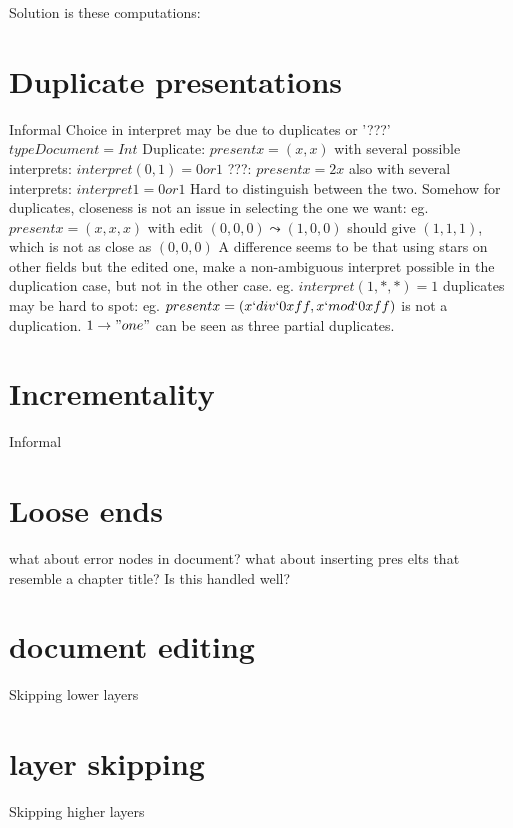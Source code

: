 Solution is these computations: 


%																
%																
%																
\section{Duplicate presentations}

Informal
\bl
\* Choice in interpret may be due to duplicates or '???'
\* $type Document = Int$ 
\* Duplicate: $present x = (x,x)$ with several possible interprets: $interpret (0,1) = 0 or 1$ 
\* ???: $present x = 2x$ also with several interprets: $interpret 1 = 0 or 1$ 
\* Hard to distinguish between the two.
\* Somehow for duplicates, closeness is not an issue in selecting the one we want:
\* eg. $present x = (x,x,x)$ with edit $(0,0,0)\leadsto(1,0,0)$ should give $(1,1,1)$, which is not as close as $(0,0,0)$
\* A difference seems to be that using stars on other fields but the edited one, make a non-ambiguous interpret possible in the duplication case, but not in the other case.
\* eg. $interpret (1,*,*) = 1$
\* duplicates may be hard to spot: eg. $present x = (x `div` 0xff, x `mod` 0xff)$ is not a duplication.
\* $1 \to "one"$ can be seen as three partial duplicates. 
\el

%																
%																
%																
\section{Incrementality}
Informal


%																
%																
%																
\section{Loose ends}
\bl
\* what about error nodes in document?
\* what about inserting pres elts that resemble a chapter title? Is this handled well?
\el


%																
%																
%																
\section{document editing}
Skipping lower layers



%																
%																
%																
\section{layer skipping}
Skipping higher layers

\renewcommand{\present}[0]{{\tt present}}					%
\renewcommand{\interpret}[0]{{\tt interpret}}				%
